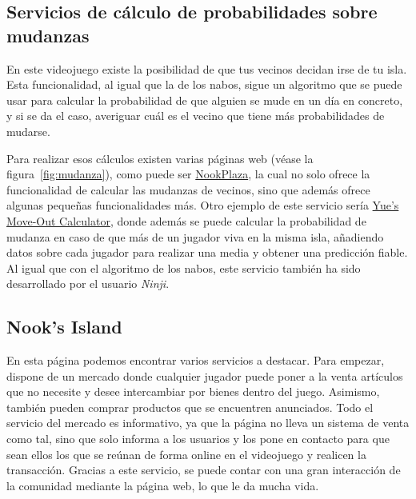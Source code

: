 \subsection{Servicios de cálculo de probabilidades sobre mudanzas}

En este videojuego existe la posibilidad de que tus vecinos decidan irse de tu isla. Esta funcionalidad, al igual que la de los nabos, sigue un algoritmo que se puede usar para calcular la probabilidad de que alguien se mude en un día en concreto, y si se da el caso, averiguar cuál es el vecino que tiene más probabilidades de mudarse.\\


Para realizar esos cálculos existen varias páginas web {(v\'ease la figura~\ref{fig:mudanza})}, como puede ser \href{https://nookplaza.net/tools?tab=move_out}{NookPlaza}, la cual no solo ofrece la funcionalidad de calcular las mudanzas de vecinos, sino que además ofrece algunas pequeñas funcionalidades más. Otro ejemplo de este servicio sería \href{https://yuexr.github.io/villager-moveout-calculator/}{Yue's Move-Out Calculator}, donde además se puede calcular la probabilidad de mudanza en caso de que más de un jugador viva en la misma isla, añadiendo datos sobre cada jugador para realizar una media y obtener una predicción fiable.\\

Al igual que con el algoritmo de los nabos, este servicio también ha sido desarrollado por el usuario \textit{Ninji}.

\subsection{Nook’s Island}


En esta página podemos encontrar varios servicios a destacar. Para empezar, dispone de un mercado donde cualquier jugador puede poner a la venta artículos que no necesite y desee intercambiar por bienes dentro del juego. Asimismo, también pueden comprar productos que se encuentren anunciados. Todo el servicio del mercado es informativo, ya que la página no lleva un sistema de venta como tal, sino que solo informa a los usuarios y los pone en contacto para que sean ellos los que se reúnan de forma online en el videojuego y realicen la transacción. Gracias a este servicio, se puede contar con una gran interacción de la comunidad mediante la página web, lo que le da mucha vida.\\

